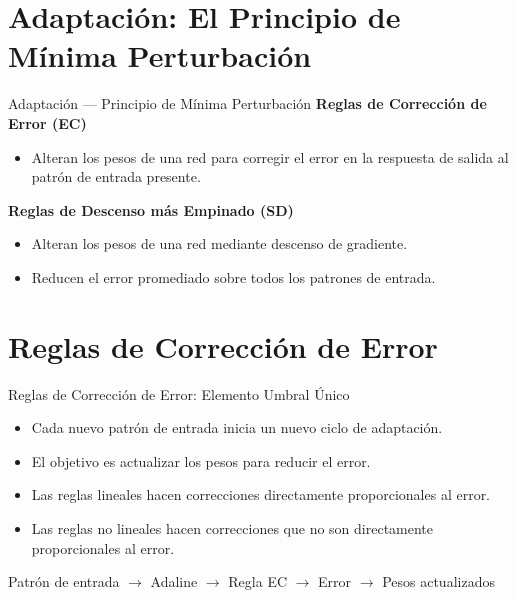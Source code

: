 \documentclass[aspectratio=169,utf8,spanish]{beamer}
\begin{document}
\section{Adaptación: El Principio de Mínima Perturbación}

\begin{frame}{Adaptación — Principio de Mínima Perturbación}
  \textbf{Reglas de Corrección de Error (EC)}
  \begin{itemize}
    \item Alteran los pesos de una red para corregir el error en la respuesta de salida al patrón de entrada presente.
  \end{itemize}

  \textbf{Reglas de Descenso más Empinado (SD)}
  \begin{itemize}
    \item Alteran los pesos de una red mediante descenso de gradiente.
    \item Reducen el error promediado sobre todos los patrones de entrada.
  \end{itemize}
\end{frame}

\section{Reglas de Corrección de Error}

\begin{frame}{Reglas de Corrección de Error: Elemento Umbral Único}
  \begin{itemize}
    \item Cada nuevo patrón de entrada inicia un nuevo ciclo de adaptación.
    \item El objetivo es actualizar los pesos para reducir el error.
    \item Las reglas lineales hacen correcciones directamente proporcionales al error.
    \item Las reglas no lineales hacen correcciones que no son directamente proporcionales al error.
  \end{itemize}
  \begin{center}
    Patrón de entrada $\to$ Adaline $\to$ Regla EC $\to$ Error $\to$ Pesos actualizados
  \end{center}
\end{frame}
\end{document}
